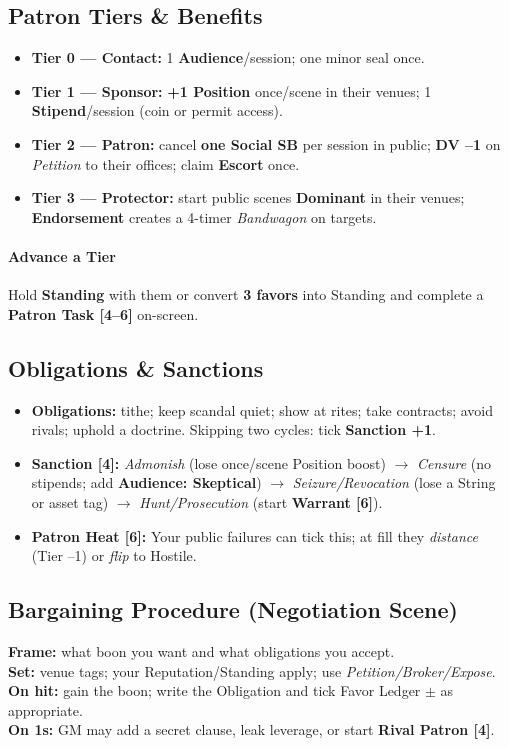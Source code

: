\documentclass[10pt]{article}
\begin{document}
\begin{center}
    \subsection{Patron Tiers \& Benefits}
    \begin{itemize}
      \item \textbf{Tier 0 --- Contact:} 1 \textbf{Audience}/session; one minor seal once.
      \item \textbf{Tier 1 --- Sponsor:} \textbf{+1 Position} once/scene in their venues; 1 \textbf{Stipend}/session (coin or permit access).
      \item \textbf{Tier 2 --- Patron:} cancel \textbf{one Social SB} per session in public; \textbf{DV --1} on \emph{Petition} to their offices; claim \textbf{Escort} once.
      \item \textbf{Tier 3 --- Protector:} start public scenes \textbf{Dominant} in their venues; \textbf{Endorsement} creates a 4-timer \emph{Bandwagon} on targets.
    \end{itemize}
    \paragraph{Advance a Tier} Hold \textbf{Standing} with them or convert \textbf{3 favors} into Standing and complete a \textbf{Patron Task [4--6]} on-screen.
    
    \subsection{Obligations \& Sanctions}
    \begin{itemize}
      \item \textbf{Obligations:} tithe; keep scandal quiet; show at rites; take contracts; avoid rivals; uphold a doctrine. Skipping two cycles: tick \textbf{Sanction +1}.
      \item \textbf{Sanction [4]:} \emph{Admonish} (lose once/scene Position boost) $\to$ \emph{Censure} (no stipends; add \textbf{Audience: Skeptical}) $\to$ \emph{Seizure/Revocation} (lose a String or asset tag) $\to$ \emph{Hunt/Prosecution} (start \textbf{Warrant [6]}).
      \item \textbf{Patron Heat [6]:} Your public failures can tick this; at fill they \emph{distance} (Tier --1) or \emph{flip} to Hostile.
    \end{itemize}
    
    \subsection{Bargaining Procedure (Negotiation Scene)}
    \textbf{Frame:} what boon you want and what obligations you accept.\\
    \textbf{Set:} venue tags; your Reputation/Standing apply; use \emph{Petition/Broker/Expose}.\\
    \textbf{On hit:} gain the boon; write the Obligation and tick Favor Ledger $\pm$ as appropriate.\\
    \textbf{On 1s:} GM may add a secret clause, leak leverage, or start \textbf{Rival Patron [4]}.
    

\end{center}
\end{document}

